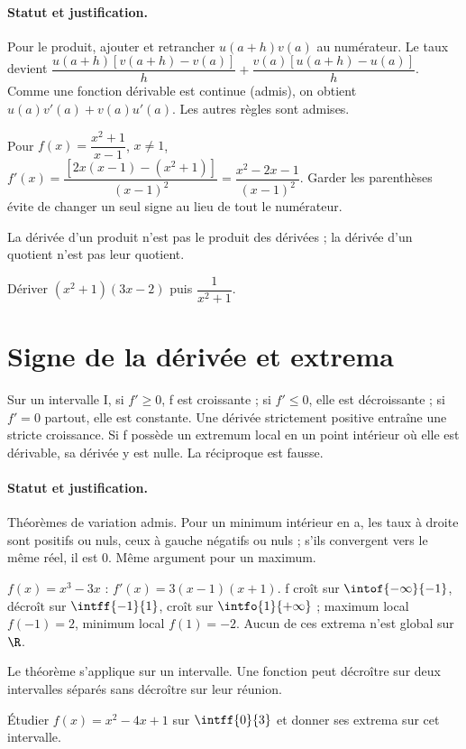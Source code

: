 \paragraph{Statut et justification.} Pour le produit, ajouter et retrancher $u(a+h)v(a)$ au numérateur. Le taux devient $\dfrac{u(a+h)[v(a+h)-v(a)]}{h}+\dfrac{v(a)[u(a+h)-u(a)]}{h}$. Comme une fonction dérivable est continue (admis), on obtient $u(a)v\prime(a)+v(a)u\prime(a)$. Les autres règles sont admises.
\begin{example}Pour $f(x)=\dfrac{x^2+1}{x-1}$, $x\ne1$, $f\prime (x)=\dfrac{[2x(x-1)-(x^2+1)]}{(x-1)^2}=\dfrac{x^2-2x-1}{(x-1)^2}$. Garder les parenthèses évite de changer un seul signe au lieu de tout le numérateur.\end{example}\label{C06-EX2}
\begin{pitfall}La dérivée d’un produit n’est pas le produit des dérivées ; la dérivée d’un quotient n’est pas leur quotient.\end{pitfall}
\begin{application}Dériver $(x^2+1)(3x-2)$ puis $\dfrac{1}{x^2+1}$.\end{application}\label{C06-AP2}
\section{Signe de la dérivée et extrema}\label{C06-U3}
\begin{keypoint}
Sur un intervalle I, si $f\prime\geq0$, f est croissante ; si $f\prime\leq0$, elle est décroissante ; si $f\prime=0$ partout, elle est constante. Une dérivée strictement positive entraîne une stricte croissance. Si f possède un extremum local en un point intérieur où elle est dérivable, sa dérivée y est nulle. La réciproque est fausse.
\end{keypoint}
\paragraph{Statut et justification.} Théorèmes de variation admis. Pour un minimum intérieur en a, les taux à droite sont positifs ou nuls, ceux à gauche négatifs ou nuls ; s’ils convergent vers le même réel, il est 0. Même argument pour un maximum.
\begin{example}$f(x)=x^3-3x$ : $f\prime(x)=3(x-1)(x+1)$. f croît sur $\intof{-\infty}{-1}$, décroît sur $\intff{-1}{1}$, croît sur $\intfo{1}{+\infty}$ ; maximum local $f(-1)=2$, minimum local $f(1)=-2$. Aucun de ces extrema n’est global sur $\R$.\end{example}\label{C06-EX3}
\begin{pitfall}Le théorème s’applique sur un intervalle. Une fonction peut décroître sur deux intervalles séparés sans décroître sur leur réunion.\end{pitfall}
\begin{application}Étudier $f(x)=x^2-4x+1$ sur $\intff{0}{3}$ et donner ses extrema sur cet intervalle.\end{application}\label{C06-AP3}
